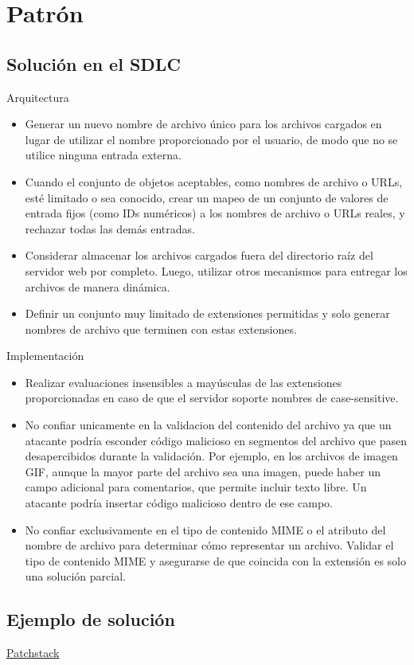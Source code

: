 \section{Patrón}
\subsection{Solución en el SDLC}
Arquitectura
\begin{itemize}
    \item Generar un nuevo nombre de archivo único para los archivos cargados en lugar de utilizar el nombre proporcionado por el usuario, de modo que no se utilice ninguna entrada externa.
    \item Cuando el conjunto de objetos aceptables, como nombres de archivo o URLs, esté limitado o sea conocido, crear un mapeo de un conjunto de valores de entrada fijos (como IDs numéricos) a los nombres de archivo o URLs reales, y rechazar todas las demás entradas.
    \item Considerar almacenar los archivos cargados fuera del directorio raíz del servidor web por completo. Luego, utilizar otros mecanismos para entregar los archivos de manera dinámica.
    \item Definir un conjunto muy limitado de extensiones permitidas y solo generar nombres de archivo que terminen con estas extensiones.
\end{itemize}

Implementación
\begin{itemize}
    \item Realizar evaluaciones insensibles a mayúsculas de las extensiones proporcionadas en caso de que el servidor soporte nombres de case-sensitive.
    \item No confiar unicamente en la validacion del contenido del archivo ya que un atacante podría esconder código malicioso en segmentos del archivo que pasen desapercibidos durante la validación. Por ejemplo, en los archivos de imagen GIF, aunque la mayor parte del archivo sea una imagen, puede haber un campo adicional para comentarios, que permite incluir texto libre. Un atacante podría insertar código malicioso dentro de ese campo.
    \item No confiar exclusivamente en el tipo de contenido MIME o el atributo del nombre de archivo para determinar cómo representar un archivo. Validar el tipo de contenido MIME y asegurarse de que coincida con la extensión es solo una solución parcial.
\end{itemize}
\subsection{Ejemplo de solución}
\href{https://patchstack.com/academy/wordpress/securing-code/arbitrary-file-upload/}{Patchstack}
